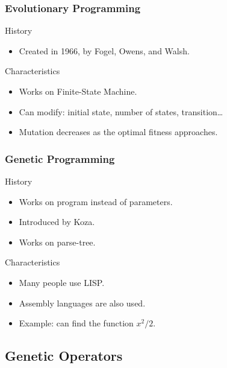 \begin{frame}
  \frametitle{Evolutionary Programming}
  \begin{block}{History}
    \begin{itemize}
      \item Created in 1966, by Fogel, Owens, and Walsh\cite{fogel1966}.
    \end{itemize}
  \end{block}

  \begin{block}{Characteristics}
    \begin{itemize}
    \item Works on Finite-State Machine.
    \item Can modify: initial state, number of states, transition\dots
    \item Mutation decreases as the optimal fitness approaches.
    \end{itemize}
  \end{block}
\end{frame}


\begin{frame}
  \frametitle{Genetic Programming}
  \begin{block}{History}
    \begin{itemize}
    \item Works on program instead of parameters.
    \item Introduced by Koza\cite{Koza92}.
    \item Works on parse-tree.
    \end{itemize}
  \end{block}

  \begin{block}{Characteristics}
    \begin{itemize}
    \item Many people use LISP.
    \item Assembly languages are also used.
    \item Example: can find the function $x^2/2$.
    \end{itemize}
  \end{block}
\end{frame}

\subsection{Genetic Operators}

